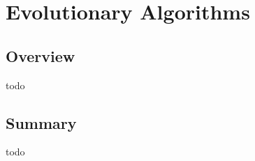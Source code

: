 


\chapter{Evolutionary Algorithms}
\label{ch:evolutionary}

\section{Overview}
todo

\newpage
\newpage
\newpage
\newpage
\newpage
\newpage
\newpage
\newpage
\newpage
\newpage
\newpage

\section{Summary}
todo
